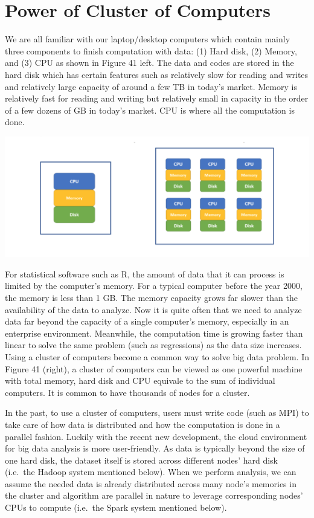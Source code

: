 \documentclass[12pt,]{krantz}
\theoremstyle{definition}
\theoremstyle{definition}
\theoremstyle{definition}
\theoremstyle{remark}
\begin{document}
\section{Power of Cluster of
Computers}\label{power-of-cluster-of-computers}

We are all familiar with our laptop/desktop computers which contain
mainly three components to finish computation with data: (1) Hard disk,
(2) Memory, and (3) CPU as shown in Figure 41 left. The data and codes
are stored in the hard disk which has certain features such as
relatively slow for reading and writes and relatively large capacity of
around a few TB in today's market. Memory is relatively fast for reading
and writing but relatively small in capacity in the order of a few
dozens of GB in today's market. CPU is where all the computation is
done.

\includegraphics{images/cluster.png}

For statistical software such as R, the amount of data that it can
process is limited by the computer's memory. For a typical computer
before the year 2000, the memory is less than 1 GB. The memory capacity
grows far slower than the availability of the data to analyze. Now it is
quite often that we need to analyze data far beyond the capacity of a
single computer's memory, especially in an enterprise environment.
Meanwhile, the computation time is growing faster than linear to solve
the same problem (such as regressions) as the data size increases. Using
a cluster of computers become a common way to solve big data problem. In
Figure 41 (right), a cluster of computers can be viewed as one powerful
machine with total memory, hard disk and CPU equivale to the sum of
individual computers. It is common to have thousands of nodes for a
cluster.

In the past, to use a cluster of computers, users must write code (such
as MPI) to take care of how data is distributed and how the computation
is done in a parallel fashion. Luckily with the recent new development,
the cloud environment for big data analysis is more user-friendly. As
data is typically beyond the size of one hard disk, the dataset itself
is stored across different nodes' hard disk (i.e.~the Hadoop system
mentioned below). When we perform analysis, we can assume the needed
data is already distributed across many node's memories in the cluster
and algorithm are parallel in nature to leverage corresponding nodes'
CPUs to compute (i.e.~the Spark system mentioned below).
\end{document}
